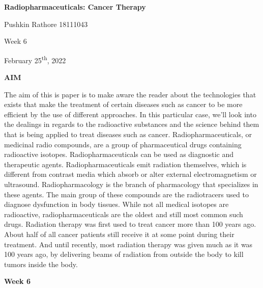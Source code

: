 \documentclass[
]{article}
\author{}
\date{}
\begin{document}
\textbf{{Radiopharmaceuticals: Cancer Therapy}}

Pushkin Rathore 18111043

Week 6

February 25\textsuperscript{th}, 2022

\textbf{AIM}

The aim of this is paper is to make aware the reader about the
technologies that exists that make the treatment of certain diseases
such as cancer to be more efficient by the use of different approaches.
In this particular case, we'll look into the dealings in regards to the
radioactive substances and the science behind them that is being applied
to treat diseases such as cancer. Radiopharmaceuticals, or medicinal
radio compounds, are a group of pharmaceutical drugs containing
radioactive isotopes. Radiopharmaceuticals can be used as diagnostic and
therapeutic agents. Radiopharmaceuticals emit radiation themselves,
which is different from contrast media which absorb or alter external
electromagnetism or ultrasound. Radiopharmacology is the branch of
pharmacology that specializes in these agents. The main group of these
compounds are the radiotracers used to diagnose dysfunction in body
tissues. While not all medical isotopes are radioactive,
radiopharmaceuticals are the oldest and still most common such drugs.
Radiation therapy was first used to treat cancer more than 100 years
ago. About half of all cancer patients still receive it at some point
during their treatment. And until recently, most radiation therapy was
given much as it was 100 years ago, by delivering beams of radiation
from outside the body to kill tumors inside the body.

\textbf{Week 6}
\end{document}
